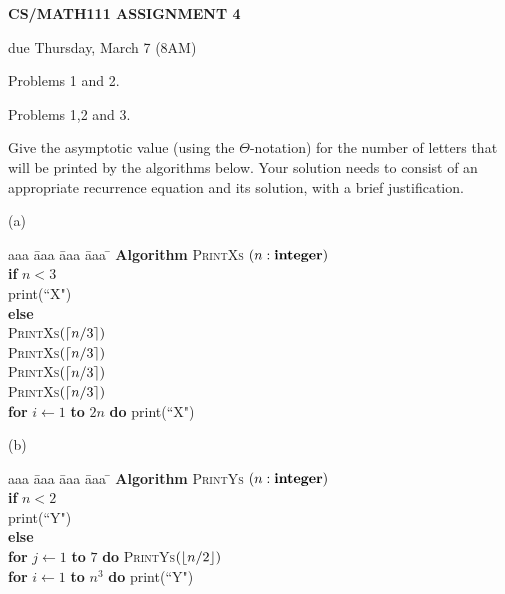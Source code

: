 \documentclass{article}
\begin{document}


\centerline{\large \bf CS/MATH111 ASSIGNMENT 4}
\centerline{due Thursday, March 7 (8AM)}

\vskip 0.2in
 Problems 1 and 2.

 Problems 1,2 and 3.

\vskip 0.1in


\begin{problem}
Give the asymptotic value (using the $\Theta$-notation)
for the number of letters that will be printed by the algorithms below.
Your solution needs to consist of an appropriate recurrence 
equation and its solution, with a brief justification.

\bigskip
\noindent
(a)\ \ 
\begin{minipage}[t]{3in}
\begin{tabbing}
aaa \= aaa \= aaa \= aaa \=  \kill
\textbf{Algorithm} \textsc{PrintXs} $(n: \mbox{\bf integer})$ \\
          \> \textbf{if} $n < 3$ \\
          \>\>  print(``X") \\
          \>\textbf{else} \\
          \>\>  \textsc{PrintXs}$({\left\lceil n/3\right\rceil})$\\
          \>\>  \textsc{PrintXs}$({\left\lceil n/3\right\rceil})$\\
          \>\>  \textsc{PrintXs}$({\left\lceil n/3\right\rceil})$\\
          \>\>  \textsc{PrintXs}$({\left\lceil n/3\right\rceil})$\\
      \>\> \textbf{for} $i \leftarrow 1$ \textbf{to} $2n$ \textbf{do} print(``X")
\end{tabbing}
\end{minipage}

\bigskip
\noindent
(b)\ \
\begin{minipage}[t]{3in}
\begin{tabbing}
aaa \= aaa \= aaa \= aaa \=  \kill
\textbf{Algorithm} \textsc{PrintYs} $(n: \mbox{\bf integer})$ \\
          \> \textbf{if} $n < 2$ \\
          \>\>  print(``Y") \\
          \>\textbf{else} \\
          \>\>  \textbf{for} $j \leftarrow 1$ \textbf{to} $7$ 
					\textbf{do} \textsc{PrintYs}$({\left\lfloor n/2\right\rfloor})$\\
      \>\> \textbf{for} $i \leftarrow 1$ \textbf{to} $n^3$ \textbf{do} print(``Y")
\end{tabbing}
\end{minipage}


\end{problem}
\end{document}
